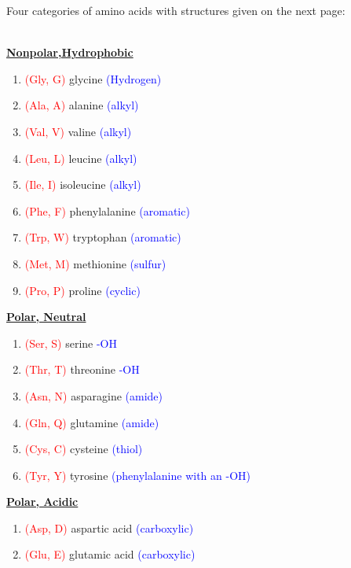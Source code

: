\documentclass[../Bio_chemistryReview.tex]{subfiles}
\begin{document}
Four categories of amino acids with structures given on the next page: \\
\hfill \\
\noindent\parbox[t]{3in}{\raggedright%
  \textbf{\underline{Nonpolar,Hydrophobic}}
  \begin{enumerate} [topsep=2pt,itemsep=-2pt,leftmargin=13pt]
    \item \textcolor{red}{(Gly, G)} glycine \textcolor{blue}{(Hydrogen)}
    \item \textcolor{red}{(Ala, A)} alanine \textcolor{blue}{(alkyl)}
    \item \textcolor{red}{(Val, V)} valine \textcolor{blue}{(alkyl)}
    \item \textcolor{red}{(Leu, L)} leucine \textcolor{blue}{(alkyl)}
    \item \textcolor{red}{(Ile, I)} isoleucine \textcolor{blue}{(alkyl)}
    \item \textcolor{red}{(Phe, F)} phenylalanine \textcolor{blue}{(aromatic)}
    \item \textcolor{red}{(Trp, W)} tryptophan \textcolor{blue}{(aromatic)}
    \item \textcolor{red}{(Met, M)} methionine \textcolor{blue}{(sulfur)}
    \item \textcolor{red}{(Pro, P)} proline \textcolor{blue}{(cyclic)}
  \end{enumerate}
}
\hspace{5em}
\noindent\parbox[t]{3in}{\raggedright%
  \textbf{\underline{Polar, Neutral}}
  \begin{enumerate} [topsep=2pt,itemsep=-2pt,leftmargin=13pt]
    \item \textcolor{red}{(Ser, S)} serine \textcolor{blue}{-OH}
    \item \textcolor{red}{(Thr, T)} threonine \textcolor{blue}{-OH}
    \item \textcolor{red}{(Asn, N)} asparagine \textcolor{blue}{(amide)}
    \item \textcolor{red}{(Gln, Q)} glutamine \textcolor{blue}{(amide)}
    \item \textcolor{red}{(Cys, C)} cysteine \textcolor{blue}{(thiol)}
    \item \textcolor{red}{(Tyr, Y)} tyrosine \textcolor{blue}{(phenylalanine
      with an -OH)} \end{enumerate}
}
\vspace{10pt}
\newline
\noindent\parbox[t]{3in}{\raggedright%
  \textbf{\underline{Polar, Acidic}}
  \begin{enumerate} [topsep=2pt,itemsep=-2pt,leftmargin=13pt]
    \item \textcolor{red}{(Asp, D)} aspartic acid \textcolor{blue}{(carboxylic)}
    \item \textcolor{red}{(Glu, E)} glutamic acid \textcolor{blue}{(carboxylic)}
  \end{enumerate}
}
\end{document}
